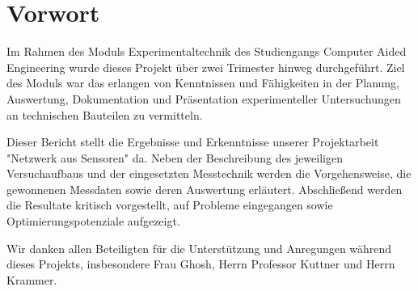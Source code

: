 
\chapter*{Vorwort}
\thispagestyle{empty} %
\todo{}

Im Rahmen des Moduls Experimentaltechnik des Studiengangs Computer Aided Engineering wurde dieses Projekt über zwei Trimester hinweg durchgeführt.
Ziel des Moduls war das erlangen von Kenntnissen und Fähigkeiten in der Planung, Auswertung, Dokumentation und Präsentation experimenteller Untersuchungen an technischen Bauteilen zu vermitteln.

Dieser Bericht stellt die Ergebnisse und Erkenntnisse unserer Projektarbeit "Netzwerk aus Sensoren" da. Neben der Beschreibung des jeweiligen Versuchaufbaus und der eingesetzten Messtechnik  werden die Vorgehensweise, die gewonnenen Messdaten sowie deren Auswertung erläutert. Abschließend werden die Resultate kritisch vorgestellt, auf Probleme eingegangen sowie Optimierungspotenziale aufgezeigt.

Wir danken allen Beteiligten für die Unterstützung und Anregungen während dieses Projekts, insbesondere Frau Ghosh, Herrn Professor Kuttner und Herrn Krammer.